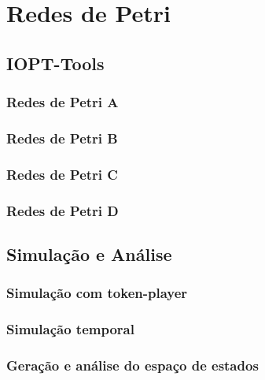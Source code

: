 \section{Redes de Petri}

\subsection{IOPT-Tools}

\subsubsection{Redes de Petri A}
\subsubsection{Redes de Petri B}
\subsubsection{Redes de Petri C}
\subsubsection{Redes de Petri D}

\subsection{Simulação e Análise}

\subsubsection{Simulação com token-player}

\subsubsection{Simulação temporal}

\subsubsection{Geração e análise do espaço de estados}
